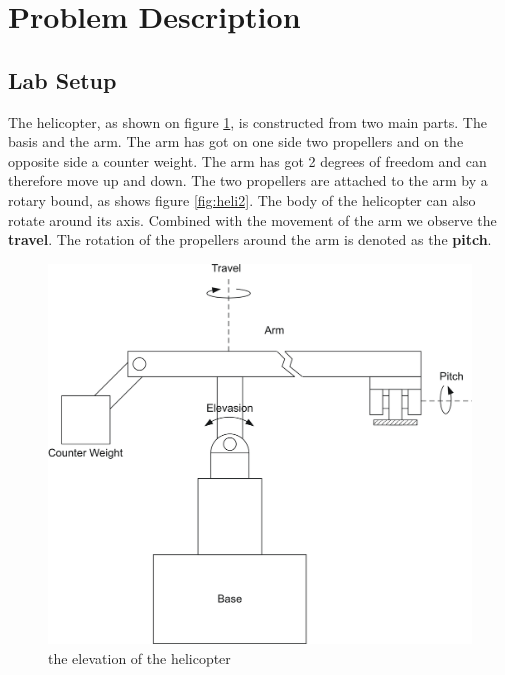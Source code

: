 \section{Problem Description}\label{sec:prob_descr}
\subsection{Lab Setup}
\graphicspath{ {figures/} }
The helicopter, as shown on figure \ref{fig:heli1}, is constructed from two main parts. The basis and the arm. The arm has got on one side two propellers and on the opposite side a counter weight. The arm has got 2 degrees of freedom and can therefore move up and down. The two propellers are attached to the arm by a rotary bound, as shows figure \ref{fig:heli2}. 
The body of the helicopter can also rotate around its axis. Combined with the movement of the arm we observe the \textbf{travel}. The rotation of the propellers around the arm is denoted as the \textbf{pitch}. 	
\begin{figure}[h]
\includegraphics[width=\textwidth]{HeliScatch1.png}
\caption{the elevation of the helicopter}
\label{fig:heli1}
\end{figure} 

